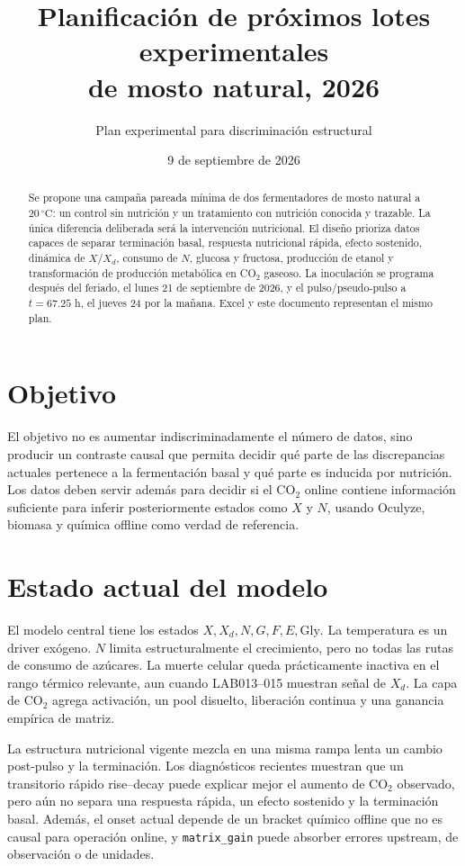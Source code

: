 \documentclass[11pt,a4paper]{article}
\title{Planificación de próximos lotes experimentales\\de mosto natural, 2026}
\author{Plan experimental para discriminación estructural}
\date{9 de septiembre de 2026}
\begin{document}
\maketitle

\begin{abstract}
Se propone una campaña pareada mínima de dos fermentadores de mosto natural a
\(20\,^{\circ}\mathrm{C}\): un control sin nutrición y un tratamiento con nutrición
conocida y trazable. La única diferencia deliberada será la intervención
nutricional. El diseño prioriza datos capaces de separar terminación basal,
respuesta nutricional rápida, efecto sostenido, dinámica de \(X/X_d\), consumo de
\(N\), glucosa y fructosa, producción de etanol y transformación de producción
metabólica en CO$_2$ gaseoso. La inoculación se programa después del feriado,
el lunes 21 de septiembre de 2026, y el pulso/pseudo-pulso a \(t=67.25\) h,
el jueves 24 por la mañana. Excel y este documento representan el mismo plan.
\end{abstract}

\section{Objetivo}

El objetivo no es aumentar indiscriminadamente el número de datos, sino producir
un contraste causal que permita decidir qué parte de las discrepancias actuales
pertenece a la fermentación basal y qué parte es inducida por nutrición. Los datos
deben servir además para decidir si el CO$_2$ online contiene información
suficiente para inferir posteriormente estados como \(X\) y \(N\), usando
Oculyze, biomasa y química offline como verdad de referencia.

\section{Estado actual del modelo}

El modelo central tiene los estados \(X,X_d,N,G,F,E,\mathrm{Gly}\). La temperatura
es un driver exógeno. \(N\) limita estructuralmente el crecimiento, pero no todas
las rutas de consumo de azúcares. La muerte celular queda prácticamente inactiva
en el rango térmico relevante, aun cuando LAB013--015 muestran señal de \(X_d\).
La capa de CO$_2$ agrega activación, un pool disuelto, liberación continua y una
ganancia empírica de matriz.

La estructura nutricional vigente mezcla en una misma rampa lenta un cambio
post-pulso y la terminación. Los diagnósticos recientes muestran que un transitorio
rápido rise--decay puede explicar mejor el aumento de CO$_2$ observado, pero aún
no separa una respuesta rápida, un efecto sostenido y la terminación basal.
Además, el onset actual depende de un bracket químico offline que no es causal
para operación online, y \texttt{matrix\_gain} puede absorber errores upstream,
de observación o de unidades.
\end{document}
